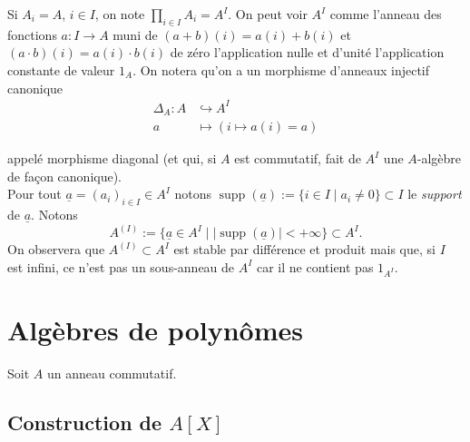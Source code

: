 \documentclass[a4paper, oneside, 12pt]{book}
\theoremstyle{theoremeStyle} %
\theoremstyle{definition} %
\DeclareMathOperator{\supp}{supp}
\begin{document}
		Si $A_i=A$, $i\in I$, on note $\prod_{i\in I}A_i=A^I$. On peut  voir $A^I$ comme l'anneau des fonctions $a:I\rightarrow A$ muni de $(a+b)(i)=a(i)+b(i)$  et $(a\cdot b)(i)=a(i)\cdot b(i)$  de zéro l'application nulle et d'unité l'application constante de valeur $1_A$. On notera qu'on a un morphisme d'anneaux injectif canonique
	\begin{align*}
		\Delta_A : A &\hookrightarrow A^I \\
		a &\mapsto (i\mapsto a(i)=a)
	\end{align*}

	appelé morphisme diagonal (et qui, si $A$ est commutatif,   fait de $A^I$  une $A$-algèbre de façon canonique).\\

  Pour tout $\underline{a}=(a_i)_{i\in I}\in A^I$ notons $\supp(\underline{a}):=\lbrace i\in I\; |\; a_i\not= 0\rbrace\subset I$ le \textit{support} de $\underline{a}$. Notons $$A^{(I)}:=\lbrace \underline{a}\in A^I\; |\; |\supp(\underline{a})|<+\infty\rbrace \subset A^I.$$
On observera que $A^{(I)}\subset A^I$ est stable par différence et produit mais que, si $I$ est infini, ce n'est pas un sous-anneau de $A^I$ car il ne contient pas $1_{A^I}$.


\section{Algèbres de polynômes}\label{Poly}Soit $A$ un anneau commutatif.
\subsection{Construction de $A[X]$}
\end{document}
